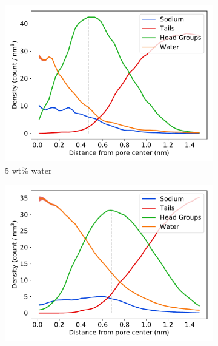 \documentclass{article}
\begin{document}
  \begin{figure}
  \centering
  \vspace{-0.4cm}
  \begin{subfigure}{0.49\linewidth}
  \includegraphics[width=\linewidth]{component_density_5wt.pdf}
  \caption{5 wt\% water}\label{fig:component_density_5wt}
  \end{subfigure}
  \begin{subfigure}{0.49\linewidth}
  \includegraphics[width=\linewidth]{component_density_10wt.pdf}

\end{subfigure}
\end{figure}
\end{document}
